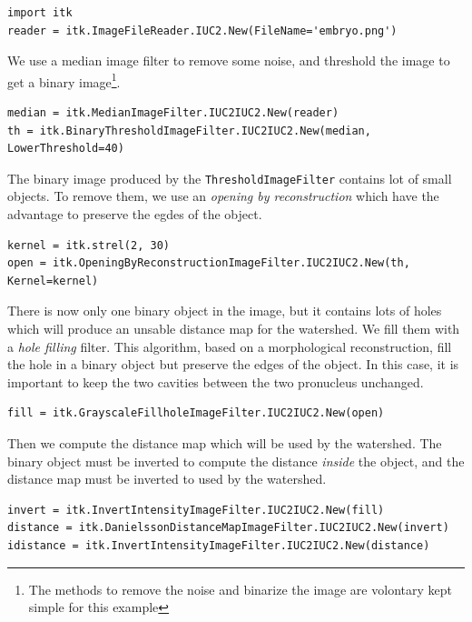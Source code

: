 \documentclass{InsightArticle}
\begin{document}
\small \begin{verbatim}
import itk
reader = itk.ImageFileReader.IUC2.New(FileName='embryo.png')
\end{verbatim} \normalsize

We use a median image filter to remove some noise, and threshold the image
to get a binary image\footnote{The methods to remove the noise and binarize the
image are volontary kept simple for this example}.

\small \begin{verbatim}
median = itk.MedianImageFilter.IUC2IUC2.New(reader)
th = itk.BinaryThresholdImageFilter.IUC2IUC2.New(median, LowerThreshold=40)
\end{verbatim} \normalsize

The binary image produced by the \verb$ThresholdImageFilter$ contains lot
of small objects. To remove them, we use an {\em opening by reconstruction}
which have the advantage to preserve the egdes of the object.

\small \begin{verbatim}
kernel = itk.strel(2, 30)
open = itk.OpeningByReconstructionImageFilter.IUC2IUC2.New(th, Kernel=kernel)
\end{verbatim} \normalsize

There is now only one binary object in the image, but it contains lots of holes
which will produce an unsable distance map for the watershed. We fill them
with a {\em hole filling} filter. This algorithm, based on a morphological
reconstruction, fill the hole in a binary object but preserve the edges of the
object. In this case, it is important to keep the two cavities between the two
pronucleus unchanged.

\small \begin{verbatim}
fill = itk.GrayscaleFillholeImageFilter.IUC2IUC2.New(open)
\end{verbatim} \normalsize

Then we compute the distance map which will be used by the watershed. The
binary object must be inverted to compute the distance {\em inside} the
object, and the distance map must be inverted to used by the watershed.

\small \begin{verbatim}
invert = itk.InvertIntensityImageFilter.IUC2IUC2.New(fill)
distance = itk.DanielssonDistanceMapImageFilter.IUC2IUC2.New(invert)
idistance = itk.InvertIntensityImageFilter.IUC2IUC2.New(distance)
\end{verbatim} \normalsize
\end{document}
